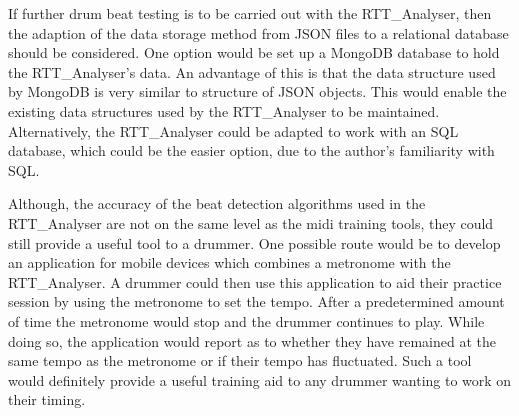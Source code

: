 \documentclass[a4paper, 11pt]{article}
\begin{document}
If further drum beat testing is to be carried out with the RTT\_Analyser, then the adaption of the data storage method from JSON files to a relational database should be considered. One option would be set up a MongoDB\cite{mongo} database to hold the RTT\_Analyser's data. An advantage of this is that the data structure used by MongoDB is very similar to structure of JSON objects. This would enable the existing data structures used by the RTT\_Analyser to be maintained. Alternatively, the RTT\_Analyser could be adapted to work with an SQL database, which could be the easier option, due to the author's familiarity with SQL.\par  

Although, the accuracy of the beat detection algorithms used in the RTT\_Analyser are not on the same level as the midi training tools, they could still provide a useful tool to a drummer. One possible route would be to develop an application for mobile devices which combines a metronome with the RTT\_Analyser. A drummer could then use this application to aid their practice session by using the metronome to set the tempo. After a predetermined amount of time the metronome would stop and the drummer continues to play. While doing so, the application would report as to whether they have remained at the same tempo as the metronome or if their tempo has fluctuated. Such a tool would definitely provide a useful training aid to any drummer wanting to work on their timing.
\end{document}

